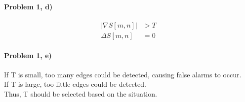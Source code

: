 \documentclass[11pt]{article}
\begin{document}
\paragraph{\noindent\textbf{\LARGE{Problem 1, d)}}}  
  
\begin{equation*}
\begin{split}
    |\nabla S[m,n]| &> T \\
    \Delta S[m,n] & = 0 
\end{split}
\end{equation*}

\paragraph{\noindent\textbf{\LARGE{Problem 1, e)}}}  
  
\begin{flushleft}
If T is small, too many edges could be detected, causing false alarms to occur.
\\
If T is large, too little edges could be detected.
\\
Thus, T should be selected based on the situation.
\end{flushleft} 
\end{document}
